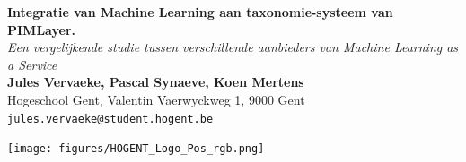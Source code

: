 \documentclass[a0,portrait]{a0poster}
\begin{document}


\begin{minipage}[t]{0.75\linewidth}
\VeryHuge \color{HoGentAccent1} \textbf{Integratie van Machine Learning aan taxonomie-systeem van PIMLayer.} \color{Black}\\ %
\Huge\textit{Een vergelijkende studie tussen \newline verschillende aanbieders van Machine Learning as a Service}\\[2.4cm] %
\huge \textbf{Jules Vervaeke, Pascal Synaeve, Koen Mertens}\\[0.5cm] %
\huge Hogeschool Gent, Valentin Vaerwyckweg 1, 9000 Gent\\[0.4cm] %
\Large \texttt{jules.vervaeke@student.hogent.be} \\
\end{minipage}
%
\begin{minipage}[t]{0.25\linewidth}
\texttt{[image: figures/HOGENT\_Logo\_Pos\_rgb.png]} 

\end{minipage}

\vspace{1cm} %

\end{document}

